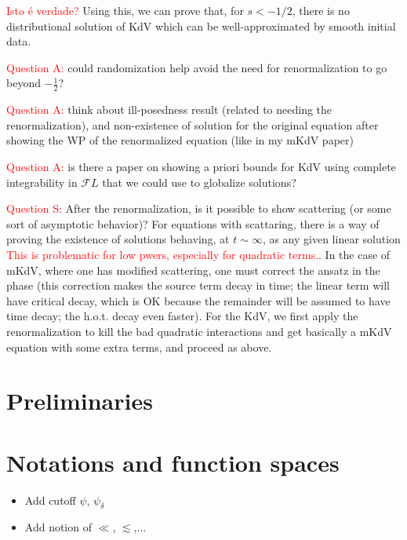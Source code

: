 \documentclass[a4paper, 11pt]{amsart}
\theoremstyle{plain}
\theoremstyle{definition}
\theoremstyle{remark}
\newcommand{\5}{\text{V}}
\newcommand{\les}{\lesssim}
\newcommand{\dl}{\delta}
\numberwithin{equation}{section}
\theoremstyle{mytheoremstyle} \newtheorem{nota}[thm]{Remark}
\theoremstyle{mytheoremstyle} \newtheorem{exemplo}[thm]{Example}
\newcommand{\red}{\color{red}}
\begin{document}
\textcolor{red}{Isto é verdade?} Using this, we can prove that, for $s<-1/2$, there is no distributional solution of KdV which can be well-approximated by smooth initial data.



\textcolor{red}{Question A:} could randomization help avoid the need for renormalization to go beyond $-\frac12$?

\textcolor{red}{Question A:} think about ill-posedness result (related to needing the renormalization), and non-existence of solution for the original equation after showing the WP of the renormalized equation (like in my mKdV paper)

\textcolor{red}{Question A:} is there a paper on showing a priori bounds for KdV using complete integrability in $\mathcal{F}L$ that we could use to globalize solutions?

\textcolor{red}{Question S:} After the renormalization, is it possible to show scattering (or some sort of asymptotic behavior)? For equations with scattaring, there is a way of proving the existence of solutions behaving, at $t\sim\infty$, as any given linear solution \textcolor{red}{This is problematic for low pwers, especially for quadratic terms.}. In the case of mKdV, where one has modified scattering, one must correct the ansatz in the phase (this correction makes the source term decay in time; the linear term will have critical decay, which is OK because the remainder will be assumed to have time decay; the h.o.t. decay even faster). For the KdV, we first apply the renormalization to kill the bad quadratic interactions and get basically a mKdV equation with some extra terms, and proceed as above.



\section{Preliminaries}


\section{Notations and function spaces}

{
\red 
\begin{itemize}
\item Add cutoff $\psi$, $\psi_\dl$

\item Add notion of $\ll$, $\les$,...
\end{itemize}
}
\end{document}

